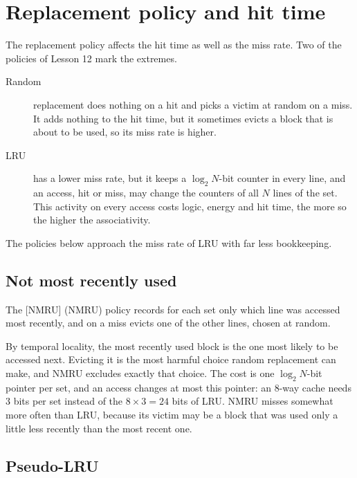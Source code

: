 \documentclass[../main.tex]{subfiles}
\begin{document}
\section{Replacement policy and hit time}
\label{sec:l14-replacement}

The replacement policy affects the hit time as well as the miss
rate.  Two of the policies of
Lesson 12 mark the extremes.
\begin{description}
  \item[Random] replacement does nothing on a hit and picks a victim at random
    on a miss.  It adds nothing to the hit time, but it sometimes evicts a
    block that is about to be used, so its miss rate is higher.
  \item[LRU] has a lower miss rate, but it keeps a $\log_2 N$-bit counter in
    every line, and an access, hit or miss, may change the counters of all
    $N$ lines of the set.  This activity on every access costs logic, energy
    and hit time, the more so the higher the associativity.
\end{description}
The policies below approach the miss rate of LRU with far less bookkeeping.

\subsection{Not most recently used}

\begin{definition}[NMRU]
  The [NMRU]%
   (NMRU) policy records for each set
  only which line was accessed most recently, and on a miss evicts one of the
  other lines, chosen at random.
\end{definition}

By temporal locality, the most recently used block is the one most likely to
be accessed next.  Evicting it is the most harmful choice random replacement
can make, and NMRU excludes exactly that choice.  The cost is one
$\log_2 N$-bit pointer per set, and an access changes at most this pointer: an
8-way cache needs 3 bits per set instead of the $8 \times 3 = 24$ bits of LRU.
NMRU misses somewhat more often than LRU, because its victim may be a block
that was used only a little less recently than the most recent one.

\subsection{Pseudo-LRU}
\end{document}
